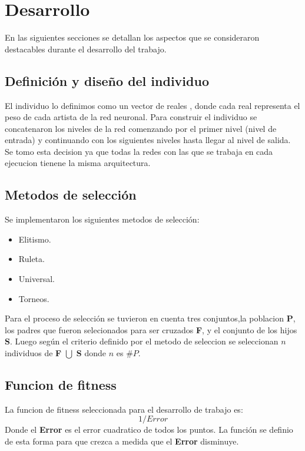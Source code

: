 \documentclass{article}
\begin{document}
\section{Desarrollo}
En las siguientes secciones se detallan los aspectos que se consideraron destacables durante el desarrollo del trabajo.

\subsection{Definición y diseño del individuo}
El individuo lo definimos como un vector de reales , donde cada real representa el peso de cada artista de la red neuronal. Para construir el individuo se concatenaron los niveles de la red comenzando por el primer nivel (nivel de entrada) y continuando con los siguientes niveles hasta llegar al nivel de salida. Se tomo esta decision ya que todas la redes con las que se trabaja en cada ejecucion tienene la misma arquitectura.

\subsection{Metodos de selección}
Se implementaron los siguientes metodos de selección:
\begin{itemize}
	\item Elitismo.
	\item Ruleta. 
	\item Universal. 
	\item Torneos.
\end{itemize}
Para el proceso de selección se tuvieron en cuenta tres conjuntos,la poblacion \textbf{P}, los padres que fueron selecionados para ser cruzados \textbf{F}, y el conjunto de los hijos \textbf{S}. Luego según el criterio definido por el metodo de seleccion se seleccionan $n$ individuos de \textbf{F} $\bigcup$ \textbf{S}  donde $n$ es $\#P$.

\subsection{Funcion de fitness}

La funcion de fitness seleccionada para el desarrollo de trabajo es:
\begin{equation}
	1 / Error
\end{equation}
Donde el \textbf{Error} es el error cuadratico de todos los puntos. La función se definio de esta forma para que crezca a medida que el \textbf{Error} disminuye.
\end{document}
